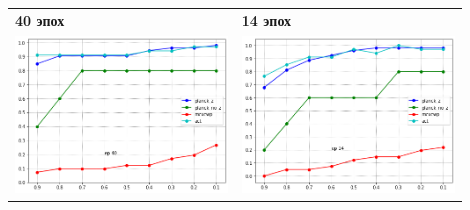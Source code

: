\documentclass{article}
\begin{document}
    \begin{table}[h!]
        \begin{tabular}{p{0.45\linewidth}p{0.45\linewidth}}
            \textbf{40 эпох} & \textbf{14 эпох}\\
            \includegraphics[width=\linewidth]{recall40} & \includegraphics[width=\linewidth]{recall14}\\ 

\end{tabular}
\end{table}
\end{document}
